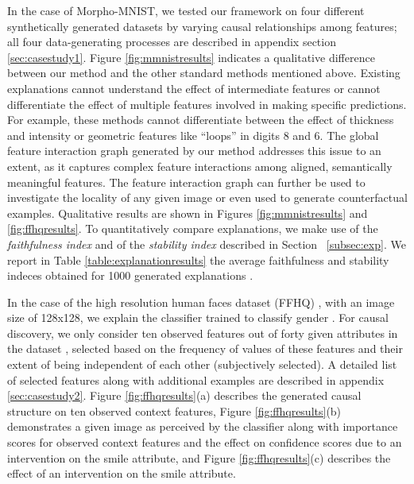 \documentclass{article}
\newcommand{\ft}[1]{{\textcolor{red}{#1}}}
\begin{document}
In the case of Morpho-MNIST, we tested our framework on four different synthetically generated datasets by varying causal relationships among features; all four data-generating processes are described in appendix section \ref{sec:casestudy1}.
Figure \ref{fig:mmnistresults} indicates a qualitative difference between our method and the other standard methods mentioned above. 
Existing explanations cannot understand the effect of intermediate features or cannot differentiate the effect of multiple features involved in making specific predictions. For example, these methods cannot differentiate between the effect of thickness and intensity or geometric features like ``loops'' in digits 8 and 6.
The global feature interaction graph generated %
by our method addresses this issue to an extent, as it captures complex feature interactions among aligned, semantically meaningful features.  
The feature interaction graph can further be used to investigate the locality of any given image or even used to generate 
counterfactual examples. Qualitative results are shown in Figures \ref{fig:mmnistresults} and \ref{fig:ffhqresults}.
To quantitatively compare explanations, we make use of the \textit{faithfulness index} %
and of the \textit{stability index} described in Section ~\ref{subsec:exp}. 
We report in Table \ref{table:explanationresults} the average faithfulness and 
stability indeces obtained for 1000 generated explanations%
. 

In the case of the high resolution human faces dataset (FFHQ) \cite{karras2019style}, with an image size of 128x128, we explain the classifier trained to classify gender%
.
For causal discovery, we only consider ten observed features out of forty given attributes in the dataset%
,
selected based on the frequency of values of these features and their extent of being independent of each other (subjectively selected). 
A detailed list of selected features along with additional examples are described in appendix \ref{sec:casestudy2}.
Figure \ref{fig:ffhqresults}(a) describes the generated causal structure on ten observed context features, Figure \ref{fig:ffhqresults}(b) demonstrates a given image as perceived by the classifier along with importance scores for observed context features and %
the effect on confidence scores due to an intervention %
on the smile attribute, and Figure \ref{fig:ffhqresults}(c) describes the effect of an intervention on the smile attribute.
\end{document}
